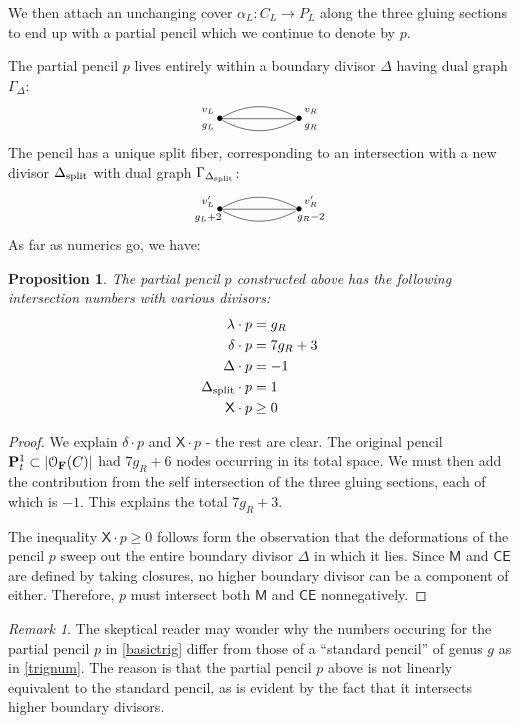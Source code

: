 \documentclass[reqno, 10 pt]{article}
\newtheorem{prop}[thm]{Proposition}
\theoremstyle{definition}
\theoremstyle{remark}
\newtheorem{rmk}[thm]{Remark}
\numberwithin{equation}{section}
\numberwithin{thm}{section}
\numberwithin{prop}{section}
\numberwithin{lem}{section}
\numberwithin{cor}{section}
\numberwithin{conj}{section}
\numberwithin{defn}{section}
\newcommand{\F}{{\mathbf F}}
\renewcommand{\to}{\longrightarrow}
\newcommand{\sfX}{{\mathsf X}}
\newcommand{\sfCE}{{\mathsf {CE}}}
\newcommand{\sfM}{{\mathsf M}}
\newcommand{\cO}{{\mathcal O}}
\renewcommand{\P}{{\bf P}}
\renewcommand{\F}{{\bf F}}
\newcommand {\from}{{\colon}}
\newcommand {\spl}{{\rm split}}
\begin{document}
We then attach an unchanging cover $\alpha_{L} \from C_{L} \to P_{L}$ along the three gluing sections to end up with a partial pencil which we continue to denote by $p$.

The partial pencil $p$ lives entirely within a boundary divisor $\Delta$ having dual graph 
$\Gamma_{\Delta}$: 
\[ \xygraph{
!{<0cm,0cm>;<1cm,0cm>:<0cm,1cm>::}
!{(0,0) }*{\bullet}="l"!{(-.3,.2)}{\scriptstyle v_L}!{(-.3,-.2)}{\scriptstyle g_L}
!{(2,0) }*{\bullet}="r"!{(2.3,.2)}{\scriptstyle v_R}!{(2.3,-.2)}{\scriptstyle g_R}
 "l"-@/^.3cm/"r" 
"l"-"r" 
"l"-@/_.3cm/"r" 
}  \] 
The pencil has a unique split fiber, corresponding to an intersection with a new divisor $\Delta_{\spl}$ with dual graph $\Gamma_{\Delta_{\spl}}$:
\[ \xygraph{
!{<0cm,0cm>;<1cm,0cm>:<0cm,1cm>::}
!{(0,0) }*{\bullet}="l"!{(-.3,.2)}{\scriptstyle v'_L}!{(-.3,-.21)}{\scriptstyle g_L+2}
!{(2,0) }*{\bullet}="r"!{(2.3,.2)}{\scriptstyle v'_R}!{(2.3,-.2)}{\scriptstyle g_R - 2}
 "l"-@/^.3cm/"r" 
"l"-"r" 
"l"-@/_.3cm/"r" 
}  \]
As far as numerics go, we have: 
\begin{prop}\label{basictrig}
The partial pencil $p$ constructed above has the following intersection numbers with various divisors: 
\begin{align*}
\lambda \cdot p &= g_{R}\\
\delta \cdot p &= 7g_{R}+3\\
\Delta \cdot p &= -1\\
\Delta_{\spl} \cdot p &= 1\\
\sfX \cdot p &\geq 0
\end{align*}
\end{prop}
\begin{proof}
We explain $\delta \cdot p$ and $\sfX \cdot p$ - the rest are clear.  The original pencil $\P^{1}_{t} \subset |\cO_{\F}(C)|$ had $7g_{R}+6$ nodes occurring in its total space.  We must then add the contribution from the self intersection of the three gluing sections, each of which is $-1$.  This explains the total $7g_{R} +3$.

The inequality $\sfX \cdot p \geq 0$ follows form the observation that the deformations of the pencil $p$ sweep out the entire boundary divisor $\Delta$ in which it lies. Since $\sfM$ and $\sfCE$ are defined by taking closures, no higher boundary divisor can be a component of either.  Therefore, $p$ must intersect both $\sfM$ and $\sfCE$ nonnegatively.
\end{proof} 

\begin{rmk}
The skeptical reader may wonder why the numbers occuring for the partial pencil $p$ in \autoref{basictrig} differ from those of a ``standard pencil'' of genus $g$ as in \autoref{trignum}.  The reason is that the partial pencil $p$ above is not linearly equivalent to the standard pencil, as is evident by the fact that it intersects higher boundary divisors.
\end{rmk}
\end{document}
